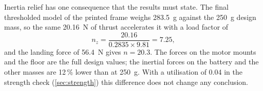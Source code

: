 Inertia relief has one consequence that the results must state. The final thresholded model of the printed frame weighs \SI{283.5}{g} against the \SI{250}{g} design mass, so the same \SI{20.16}{N} of thrust accelerates it with a load factor of
\begin{equation}
n_z = \frac{20.16}{0.2835 \times 9.81} = 7.25,
\end{equation}
and the landing force of \SI{56.4}{N} gives $n = 20.3$. The forces on the motor mounts and the floor are the full design values; the inertial forces on the battery and the other masses are 12\,\% lower than at \SI{250}{g}. With a utilisation of 0.04 in the strength check (\cref{sec:strength}) this difference does not change any conclusion.
